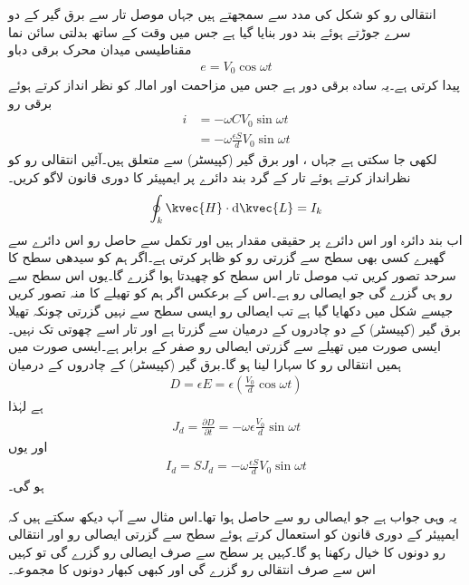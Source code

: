 انتقالی رو کو شکل  کی مدد سے سمجھتے ہیں جہاں موصل تار سے برق گیر   کے دو سرے جوڑتے ہوئے بند دور بنایا گیا ہے جس میں وقت کے ساتھ بدلتی سائن نما مقناطیسی میدان  محرک برقی دباو
\begin{align*}
e=V_0 \cos \omega t
\end{align*}
 پیدا کرتی ہے۔یہ سادہ برقی دور ہے جس میں مزاحمت اور امالہ کو نظر انداز کرتے ہوئے برقی رو
\begin{align*}
i&=-\omega C V_0 \sin \omega t\\
&=-\omega \frac{\epsilon S}{d} V_0 \sin \omega t
\end{align*}
لکھی جا سکتی ہے جہاں ،  اور  برق گیر (کپیسٹر) سے متعلق ہیں۔آئیں انتقالی رو کو نظرانداز کرتے ہوئے تار کے گرد بند دائرے   پر ایمپیئر کا دوری قانون لاگو کریں۔
\begin{align*}
\oint_k \kvec{H} \cdot \dif \kvec{L}=I_k
\end{align*}
اب بند دائرہ  اور اس دائرے پر  حقیقی مقدار ہیں اور تکمل سے حاصل رو  اس دائرے سے گھیرے کسی بھی سطح سے گزرتی رو کو ظاہر کرتی ہے۔اگر ہم  کو سیدھی سطح کا سرحد تصور کریں تب موصل تار اس سطح کو چھیدتا ہوا گزرے گا۔یوں اس سطح سے  رو ہی گزرے گی جو ایصالی رو ہے۔اس کے برعکس اگر ہم  کو تھیلے کا منہ تصور کریں جیسے شکل میں دکھایا گیا ہے تب ایصالی رو ایسی سطح سے نہیں گزرتی چونکہ تھیلا برق گیر (کپیسٹر)  کے دو چادروں کے درمیان سے گزرتا ہے اور تار اسے چھوتی تک نہیں۔ایسی صورت میں تھیلے سے گزرتی ایصالی رو صفر کے برابر ہے۔ایسی صورت میں ہمیں انتقالی رو کا سہارا لینا ہو گا۔برق گیر (کپیسٹر)  کے چادروں کے درمیان
\begin{align*}
D=\epsilon E=\epsilon \left(\frac{V_0}{d} \cos \omega t \right)
\end{align*}
ہے لہٰذا
\begin{align*}
J_d=\frac{\partial D}{\partial t}=-\omega \epsilon \frac{V_0}{d} \sin \omega t
\end{align*}
اور یوں
\begin{align*}
I_d=S J_d =-\omega \frac{\epsilon  S}{d} V_0\sin \omega t 
\end{align*}
ہو گی۔

یہ وہی جواب ہے جو ایصالی رو سے حاصل ہوا تھا۔اس مثال سے آپ دیکھ سکتے ہیں کہ ایمپیئر کے دوری قانون کو استعمال کرتے ہوئے سطح سے  گزرتی ایصالی رو اور انتقالی رو دونوں کا خیال رکھنا ہو گا۔کہیں پر سطح سے صرف ایصالی رو گزرے گی تو کہیں اس سے صرف انتقالی رو گزرے گی اور کبھی کبھار دونوں کا مجموعہ۔

